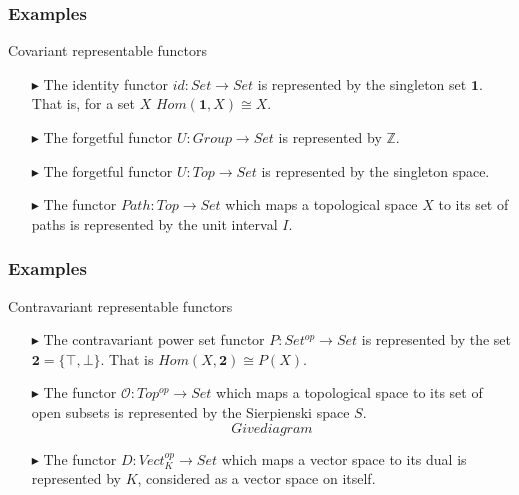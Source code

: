 \documentclass[10pt,compress]{beamer}
\begin{document}
\begin{frame}\label{frame : eg of cov rep func}
\frametitle{Examples}

\begin{block}{Covariant representable functors}
\begin{enumerate}

\item[$\blacktriangleright$] The identity functor $id : Set \to Set$ is represented by
the singleton set $\mathbf{1}$. That is, for a set $X$
$Hom(\mathbf{1}, X) \cong X$.

\item[$\blacktriangleright$] The forgetful functor $U : Group \to Set$ is represented by
$\mathbb{Z}$.

\item[$\blacktriangleright$] The forgetful functor $U : Top \to Set$ is represented by the
singleton space.

\item[$\blacktriangleright$] The functor $Path : Top \to Set$ which maps a topological space
$X$ to its set of paths is represented by the unit interval $I$.
\end{enumerate}

\end{block}

\end{frame}


\begin{frame}\label{frame : eg of contra rep func}

\frametitle{Examples}

\begin{block}{Contravariant representable functors}
\begin{enumerate}

\item[$\blacktriangleright$] 
The contravariant power set functor $P : Set^{op} \to Set$ is represented by the set
$\mathbf{2} = \{\top, \bot\}$. That is $Hom(X,\mathbf{2}) \cong P(X)$.

\item[$\blacktriangleright$] 
The functor $\mathcal{O} : Top^{op} \to Set$ which maps a topological space to its
set of open subsets is represented by the Sierpienski space $S$.
\[ Give diagram\]

\item[$\blacktriangleright$]
The functor $D : Vect_K^{op} \to Set$ which maps a vector space to its dual is represented by
$K$, considered as a vector space on itself.

\end{enumerate}

\end{block}

\end{frame}
\end{document}
